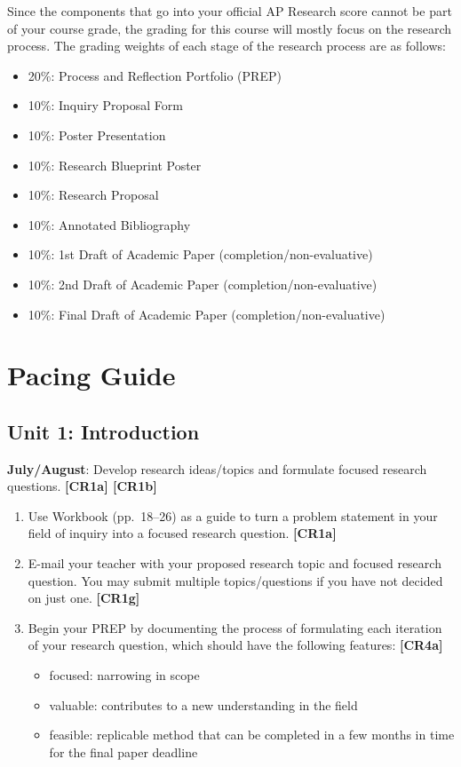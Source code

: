 \documentclass[11pt,]{article}
\providecommand{\tightlist}{%
  \setlength{\itemsep}{0pt}\setlength{\parskip}{0pt}}
\begin{document}
Since the components that go into your official AP Research score cannot be part of your course grade, the grading for this course will mostly focus on the research process. The grading weights of each stage of the research process are as follows:

\begin{itemize}
\tightlist
\item
  20\%: Process and Reflection Portfolio (PREP)
\item
  10\%: Inquiry Proposal Form
\item
  10\%: Poster Presentation
\item
  10\%: Research Blueprint Poster
\item
  10\%: Research Proposal
\item
  10\%: Annotated Bibliography
\item
  10\%: 1st Draft of Academic Paper (completion/non-evaluative)
\item
  10\%: 2nd Draft of Academic Paper (completion/non-evaluative)
\item
  10\%: Final Draft of Academic Paper (completion/non-evaluative)
\end{itemize}

\hypertarget{pacing-guide}{%
\section{Pacing Guide}\label{pacing-guide}}

\hypertarget{unit-1-introduction}{%
\subsection{Unit 1: Introduction}\label{unit-1-introduction}}

\textbf{July/August}: Develop research ideas/topics and formulate focused research questions. \textbf{{[}CR1a{]} {[}CR1b{]}}  

\begin{enumerate}
\def\labelenumi{\arabic{enumi}.}
\item
  Use Workbook (pp.~18--26) as a guide to turn a problem statement in your field of inquiry into a focused research question. \textbf{{[}CR1a{]}} 
\item
  E-mail your teacher with your proposed research topic and focused research question. You may submit multiple topics/questions if you have not decided on just one. \textbf{{[}CR1g{]}} 
\item
  Begin your PREP by documenting the process of formulating each iteration of your research question, which should have the following features: \textbf{{[}CR4a{]}} 

  \begin{itemize}
  \tightlist
  \item
    focused: narrowing in scope
  \item
    valuable: contributes to a new understanding in the field
  \item
    feasible: replicable method that can be completed in a few months in time for the final paper deadline
  \end{itemize}
\end{enumerate}
\end{document}
